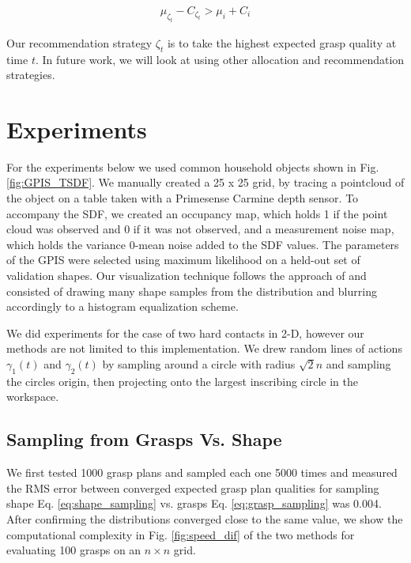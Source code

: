 \documentclass[letterpaper, 10 pt, conference]{ieeeconf}  %
\begin{document}
\vspace{-2ex}
\begin{align*}
\mu_{\zeta_t} - C_{\zeta_t} >   \mu_{i}+C_{i}
\end{align*}

Our recommendation strategy $\zeta_t$ is to take the highest expected grasp quality at time $t$. In future work, we will look at using other allocation and recommendation strategies. 

\section{Experiments}
For the experiments below we used common household objects shown in Fig. \ref{fig:GPIS_TSDF}. We manually created a 25 x 25 grid, by tracing a pointcloud of the object on a table taken with a Primesense Carmine depth sensor. To accompany the SDF, we created an occupancy map, which holds 1 if the point cloud was observed and 0 if it was not observed, and a measurement noise map, which holds the variance 0-mean noise added to the SDF values. The parameters of the GPIS were selected using maximum likelihood on a held-out set of validation shapes. Our visualization technique follows the approach of \cite{jeffs} and consisted of drawing many shape samples from the distribution and blurring accordingly to a histogram equalization scheme. 

We did experiments for the case of two hard contacts in 2-D, however our methods are not limited to this implementation. We drew random lines of actions $\gamma_1(t)$ and $\gamma_2(t)$ by sampling around a circle with radius $\sqrt{2}n$ and sampling the circles origin, then projecting onto the largest inscribing circle in the workspace. 


\subsection{Sampling from Grasps Vs. Shape}
We first tested 1000 grasp plans and sampled each one 5000 times  and measured the RMS error between converged expected grasp plan qualities for sampling shape Eq. \ref{eq:shape_sampling} vs. grasps  Eq. \ref{eq:grasp_sampling} was 0.004. After confirming the distributions converged close to the same value, we show the computational complexity in Fig. \ref{fig:speed_dif} of the two methods for evaluating 100 grasps on an $n \times n$ grid. 
\end{document}
